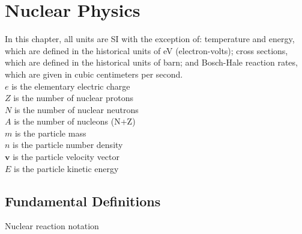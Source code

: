 \chapter{Nuclear Physics}
In this chapter, all units are SI with the exception of: temperature
and energy, which are defined in the historical units of eV
(electron-volts); cross sections, which are defined in the historical
units of barn; and Bosch-Hale reaction rates, which are given in cubic
centimeters per second.\\

\noindent
$e$ is the elementary electric charge\\
$Z$ is the number of nuclear protons\\
$N$ is the number of nuclear neutrons\\
$A$ is the number of nucleons (N+Z)\\
$m$ is the particle mass\\
$n$ is the particle number density\\
$\mathbf{v}$ is the particle velocity vector\\
$E$ is the particle kinetic energy\\


\section{Fundamental Definitions}
Nuclear reaction notation 

